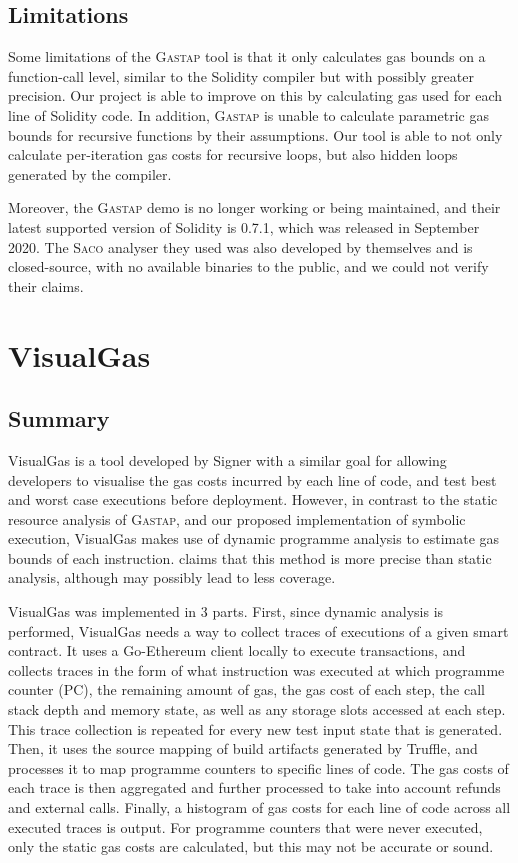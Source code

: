 \subsection{Limitations}

Some limitations of the \textsc{Gastap} tool is that it only calculates gas bounds on a function-call level,
similar to the Solidity compiler but with possibly greater precision. Our project is able to improve on
this by calculating gas used for each line of Solidity code. In addition, \textsc{Gastap} is unable 
to calculate parametric gas bounds for recursive functions by their assumptions. Our tool is able to not only
calculate per-iteration gas costs for recursive loops, but also hidden loops generated by the compiler.

Moreover, the \textsc{Gastap} demo is no longer
working or being maintained, and their latest supported version of Solidity is 0.7.1, which was released
in September 2020. The \textsc{Saco} analyser they used was also developed by themselves and is
closed-source, with no available binaries to the public, and we could not verify their claims.

\section{VisualGas}
\label{section:visualgas}

\subsection{Summary}

VisualGas is a tool developed by Signer \cite{visualgas} with a similar goal for allowing developers 
to visualise the gas costs incurred by each line of code, and test best and worst case executions
before deployment. However, in contrast to the static resource analysis of \textsc{Gastap}, and our
proposed implementation of symbolic execution, VisualGas makes use of dynamic programme analysis
to estimate gas bounds of each instruction. \cite{visualgas} claims that this method is more precise
than static analysis, although may possibly lead to less coverage.

VisualGas was implemented in 3 parts. First, since dynamic analysis is performed, VisualGas needs 
a way to collect traces of executions of a given smart contract. It uses a Go-Ethereum client 
locally to execute transactions, and collects traces in the form of what instruction was
executed at which programme counter (PC), the remaining amount of gas, the gas cost of each step,
the call stack depth and memory state, as well as any storage slots accessed at each step. This trace
collection is repeated for every new test input state that is generated. Then,
it uses the source mapping of build artifacts generated by Truffle, and processes it to map
programme counters to specific lines of code. The gas costs of each trace is then aggregated 
and further processed to take into account refunds and external calls. Finally, a histogram of
gas costs for each line of code across all executed traces is output. For programme counters that were
never executed, only the static gas costs are calculated, but this may not be accurate or sound.


